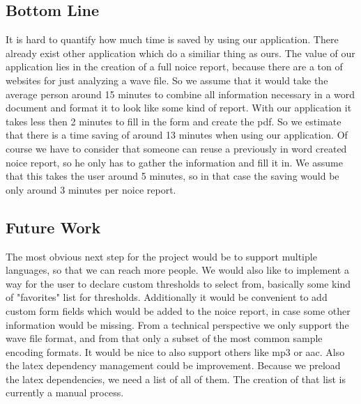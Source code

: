 \subsection{Bottom Line}
It is hard to quantify how much time is saved by using our application. There already exist other application which do a similiar thing as ours. The value of our application lies in the creation of a full noice report, because there are a ton of websites for just analyzing a wave file. So we assume that it would take the average person around 15 minutes to combine all information necessary in a word document and format it to look like some kind of report. With our application it takes less then 2 minutes to fill in the form and create the pdf. So we estimate that there is a time saving of around 13 minutes when using our application. Of course we have to consider that someone can reuse a previously in word created noice report, so he only has to gather the information and fill it in. We assume that this takes the user around 5 minutes, so in that case the saving would be only around 3 minutes per noice report.

\subsection{Future Work}
The most obvious next step for the project would be to support multiple languages, so that we can reach more people. We would also like to implement a way for the user to declare custom thresholds to select from, basically some kind of "favorites" list for thresholds. Additionally it would be convenient to add custom form fields which would be added to the noice report, in case some other information would be missing. From a technical perspective we only support the wave file format, and from that only a subset of the most common sample encoding formats. It would be nice to also support others like mp3 or aac. Also the latex dependency management could be improvement. Because we preload the latex dependencies, we need a list of all of them. The creation of that list is currently a manual process.